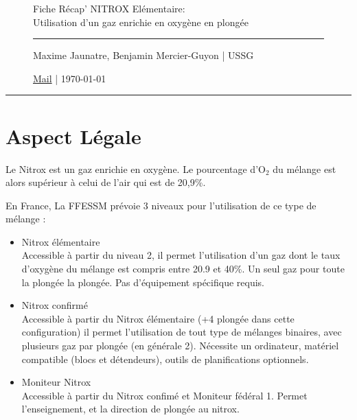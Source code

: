 \documentclass[12pt,a4paper,notitlepage,colorinlistoftodos]{article}
\begin{document}
\begin{figure}
    \begin{minipage}{.75\textwidth}
    \begin{center}
    {\Large Fiche Récap' NITROX Elémentaire: \\
Utilisation d'un gaz enrichie en oxygène en plongée}
    \end{center}
    \rule{7em}{.4pt}\par
     Maxime Jaunatre, Benjamin Mercier-Guyon | USSG \par 
     \href{mailto:maxime.jaunatre@yahoo.fr}{Mail} | \today
\end{minipage}
\end{figure}

\hrule

\iffalse
 Maxime Jaunatre <maxime.jaunatre@etu.univ-grenoble-alpes.fr>
\fi

\section{Aspect Légale}
Le Nitrox est un gaz enrichie en oxygène. Le pourcentage d'O$_2$ du mélange est alors supérieur à celui de l'air qui est de 20,9\%.

En France, La FFESSM prévoie 3 niveaux pour l'utilisation de ce type de mélange :
\begin{itemize}
\item Nitrox élémentaire \\
Accessible à partir du niveau 2, il permet l'utilisation d'un gaz dont le taux d'oxygène du mélange est compris entre 20.9 et 40\%. Un seul gaz pour toute la plongée la plongée. Pas d'équipement spécifique requis.

\item Nitrox confirmé \\
Accessible à partir du Nitrox élémentaire (+4 plongée dans cette configuration) il permet l'utilisation de tout type de mélanges binaires, avec plusieurs gaz par plongée (en générale 2). Nécessite un ordinateur, matériel compatible (blocs et détendeurs), outils de planifications optionnels.  

\item Moniteur Nitrox \\
Accessible à partir du Nitrox confimé et Moniteur fédéral 1. Permet l'enseignement, et la direction de plongée au nitrox.
\end{itemize} 
\end{document}
